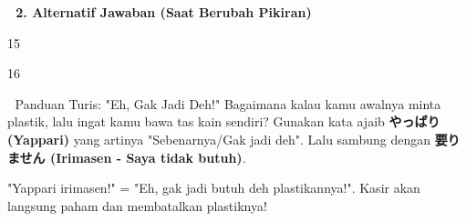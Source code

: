 \vspace{2em}
\begin{tcolorbox}[colback=boxframe, colframe=boxframe, rounded corners, boxrule=0pt, arc=3mm, left=2mm, top=2mm, bottom=2mm]
    \Large \bfseries \color{white} 💬 2. Alternatif Jawaban (Saat Berubah Pikiran)
\end{tcolorbox}
\vspace{1em}

\begin{convobox}{15}
    \noindent
      

    \vspace{1.5em}
\end{convobox}

\begin{convobox}{16}
    \noindent

    \vspace{1.5em}
\end{convobox}

\begin{lessonbox}{🔄 Panduan Turis: "Eh, Gak Jadi Deh!"}
    Bagaimana kalau kamu awalnya minta plastik, lalu ingat kamu bawa tas kain sendiri? 
    Gunakan kata ajaib \textbf{やっぱり (Yappari)} yang artinya "Sebenarnya/Gak jadi deh". Lalu sambung dengan \textbf{要りません (Irimasen - Saya tidak butuh)}. 
    
    "Yappari irimasen!" = "Eh, gak jadi butuh deh plastikannya!". Kasir akan langsung paham dan membatalkan plastiknya!
\end{lessonbox}


